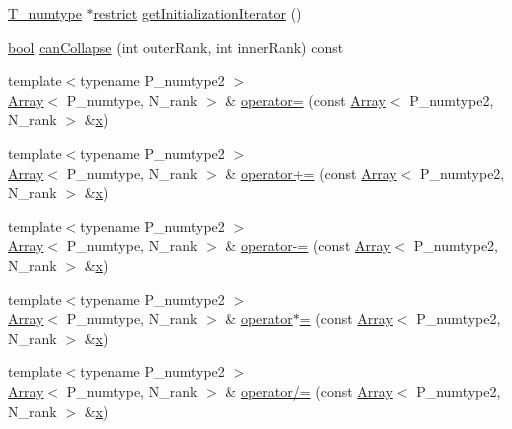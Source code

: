 \begin{DoxyCompactItemize}
\item 
\hyperlink{classArray_ae72770f4a1d2f8b7193badafc320f008}{T\+\_\+numtype} $\ast$\hyperlink{compiler_8h_a080abdcb9c02438f1cd2bb707af25af8}{restrict} \hyperlink{classArray_adcddc81286aed87edf23b9bc569206c6}{get\+Initialization\+Iterator} ()
\item 
\hyperlink{compiler_8h_abb452686968e48b67397da5f97445f5b}{bool} \hyperlink{classArray_ac63d4b673342ba9e1b84eefccd6a92c7}{can\+Collapse} (int outer\+Rank, int inner\+Rank) const 
\item 
{\footnotesize template$<$typename P\+\_\+numtype2 $>$ }\\\hyperlink{classArray}{Array}$<$ P\+\_\+numtype, N\+\_\+rank $>$ \& \hyperlink{classArray_aa0d94f5b5be567b8ca43f9a62f1f9348}{operator=} (const \hyperlink{classArray}{Array}$<$ P\+\_\+numtype2, N\+\_\+rank $>$ \&\hyperlink{vecnorm1_8cc_ac73eed9e41ec09d58f112f06c2d6cb63}{x})
\item 
{\footnotesize template$<$typename P\+\_\+numtype2 $>$ }\\\hyperlink{classArray}{Array}$<$ P\+\_\+numtype, N\+\_\+rank $>$ \& \hyperlink{classArray_ae3e715032fdb809685708f82b6a4240d}{operator+=} (const \hyperlink{classArray}{Array}$<$ P\+\_\+numtype2, N\+\_\+rank $>$ \&\hyperlink{vecnorm1_8cc_ac73eed9e41ec09d58f112f06c2d6cb63}{x})
\item 
{\footnotesize template$<$typename P\+\_\+numtype2 $>$ }\\\hyperlink{classArray}{Array}$<$ P\+\_\+numtype, N\+\_\+rank $>$ \& \hyperlink{classArray_ada1438790d2cfcbc7b9790a73c2a31a7}{operator-\/=} (const \hyperlink{classArray}{Array}$<$ P\+\_\+numtype2, N\+\_\+rank $>$ \&\hyperlink{vecnorm1_8cc_ac73eed9e41ec09d58f112f06c2d6cb63}{x})
\item 
{\footnotesize template$<$typename P\+\_\+numtype2 $>$ }\\\hyperlink{classArray}{Array}$<$ P\+\_\+numtype, N\+\_\+rank $>$ \& \hyperlink{classArray_aea2d18d441dd141d071d8a6055f822dc}{operator$\ast$=} (const \hyperlink{classArray}{Array}$<$ P\+\_\+numtype2, N\+\_\+rank $>$ \&\hyperlink{vecnorm1_8cc_ac73eed9e41ec09d58f112f06c2d6cb63}{x})
\item 
{\footnotesize template$<$typename P\+\_\+numtype2 $>$ }\\\hyperlink{classArray}{Array}$<$ P\+\_\+numtype, N\+\_\+rank $>$ \& \hyperlink{classArray_aca7f5e83ad091894968b4c5701deeac2}{operator/=} (const \hyperlink{classArray}{Array}$<$ P\+\_\+numtype2, N\+\_\+rank $>$ \&\hyperlink{vecnorm1_8cc_ac73eed9e41ec09d58f112f06c2d6cb63}{x})

\end{DoxyCompactItemize}
